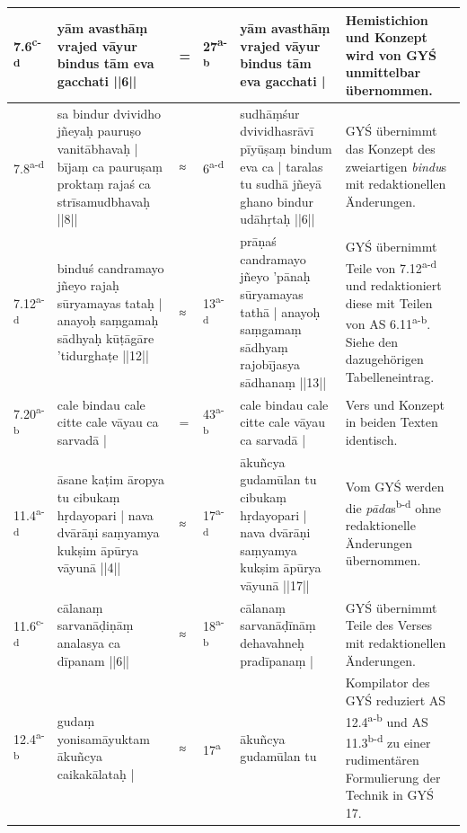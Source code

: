 \documentclass[a4paper,12pt]{article}
\begin{document}
{\begin{tabularx}{\textwidth}{p{}|p{}|p{}|p{}|p{}|p{}}
\hline
7.6\textsuperscript{c-d} & yām avasthāṃ vrajed vāyur bindus tām eva gacchati ||6|| & = & 27\textsuperscript{a-b} & yām avasthāṃ vrajed vāyur bindus tām eva gacchati | & Hemistichion und Konzept wird von GYŚ unmittelbar übernommen. \\

\hline
7.8\textsuperscript{a-d} & sa bindur dvividho jñeyaḥ pauruṣo vanitābhavaḥ | bījaṃ ca pauruṣaṃ proktaṃ rajaś ca strīsamudbhavaḥ ||8|| & ≈ & 6\textsuperscript{a-d} & sudhāṃśur dvividhasrāvī pīyūṣaṃ bindum eva ca | taralas tu sudhā jñeyā ghano bindur udāhṛtaḥ ||6|| & GYŚ übernimmt das Konzept des zweiartigen \textit{bindu}s mit redaktionellen Änderungen. \\

\hline
7.12\textsuperscript{a-d} & binduś candramayo jñeyo rajaḥ sūryamayas tataḥ | anayoḥ saṃgamaḥ sādhyaḥ kūṭāgāre 'tidurghaṭe ||12|| & ≈ & 13\textsuperscript{a-d} & prāṇaś candramayo jñeyo ’pānaḥ sūryamayas tathā | anayoḥ saṃgamaṃ sādhyaṃ rajobījasya sādhanaṃ ||13|| & GYŚ übernimmt Teile von 7.12\textsuperscript{a-d} und redaktioniert diese mit Teilen von AS 6.11\textsuperscript{a-b}. Siehe den dazugehörigen Tabelleneintrag. \\  

\hline
7.20\textsuperscript{a-b} & cale bindau cale citte cale vāyau ca sarvadā | & = & 43\textsuperscript{a-b} & cale bindau cale citte cale vāyau ca sarvadā | & Vers und Konzept in beiden Texten identisch. \\

\hline
11.4\textsuperscript{a-d} & āsane kaṭim āropya tu cibukaṃ hṛdayopari | nava dvārāṇi saṃyamya kukṣim āpūrya vāyunā ||4|| & ≈ & 17\textsuperscript{a-d} & ākuñcya gudamūlan tu cibukaṃ hṛdayopari | nava dvārāṇi saṃyamya kukṣim āpūrya vāyunā ||17|| & Vom GYŚ werden die \textit{pāda}s\textsuperscript{b-d} ohne redaktionelle Änderungen übernommen. \\

\hline
11.6\textsuperscript{c-d} & cālanaṃ sarvanāḍiṇāṃ analasya ca dīpanam ||6|| & ≈ & 18\textsuperscript{a-b} & cālanaṃ sarvanāḍīnāṃ dehavahneḥ pradīpanaṃ | & GYŚ übernimmt Teile des Verses mit redaktionellen Änderungen. \\

\hline
12.4\textsuperscript{a-b} & gudaṃ yonisamāyuktam ākuñcya caikakālataḥ | & ≈ & 17\textsuperscript{a} & ākuñcya gudamūlan tu & Kompilator des GYŚ reduziert AS 12.4\textsuperscript{a-b} und AS 11.3\textsuperscript{b-d} zu einer rudimentären Formulierung der Technik in GYŚ 17. \\


\end{tabularx}}
\end{document}
